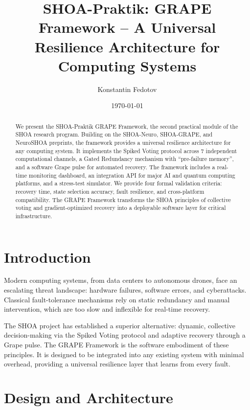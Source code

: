 \documentclass[12pt]{article}
\title{SHOA-Praktik: GRAPE Framework -- A Universal Resilience Architecture for Computing Systems}
\author{Konstantin Fedotov}
\date{\today}
\begin{document}
\maketitle

\begin{abstract}
We present the SHOA-Praktik GRAPE Framework, the second practical module of the SHOA research program. Building on the SHOA-Neuro, SHOA-GRAPE, and NeuroSHOA preprints, the framework provides a universal resilience architecture for any computing system. It implements the Spiked Voting protocol across 7 independent computational channels, a Gated Redundancy mechanism with ``pre-failure memory'', and a software Grape pulse for automated recovery. The framework includes a real-time monitoring dashboard, an integration API for major AI and quantum computing platforms, and a stress-test simulator. We provide four formal validation criteria: recovery time, state selection accuracy, fault resilience, and cross-platform compatibility. The GRAPE Framework transforms the SHOA principles of collective voting and gradient-optimized recovery into a deployable software layer for critical infrastructure.
\end{abstract}

\section{Introduction}
Modern computing systems, from data centers to autonomous drones, face an escalating threat landscape: hardware failures, software errors, and cyberattacks. Classical fault-tolerance mechanisms rely on static redundancy and manual intervention, which are too slow and inflexible for real-time recovery.

The SHOA project has established a superior alternative: dynamic, collective decision-making via the Spiked Voting protocol and adaptive recovery through a Grape pulse. The GRAPE Framework is the software embodiment of these principles. It is designed to be integrated into any existing system with minimal overhead, providing a universal resilience layer that learns from every fault.

\section{Design and Architecture}
\end{document}
